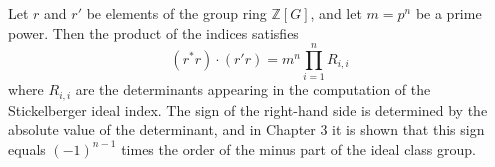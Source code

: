 Let $r$ and $r'$ be elements of the group ring $\mathbb{Z}[G]$, and let $m = p^n$ be a prime power. Then the product of the indices satisfies
$$(r^* r) \cdot (r' r) = m^n \prod_{i=1}^{n} R_{i,i}$$
where $R_{i,i}$ are the determinants appearing in the computation of the Stickelberger ideal index. The sign of the right-hand side is determined by the absolute value of the determinant, and in Chapter 3 it is shown that this sign equals $(-1)^{n-1}$ times the order of the minus part of the ideal class group.
